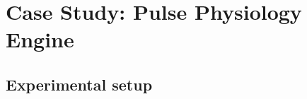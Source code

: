


\section{Case Study: Pulse Physiology Engine} \label{sec:case-study}

\subsection{Experimental setup} \label{sec:experimental-setup}

